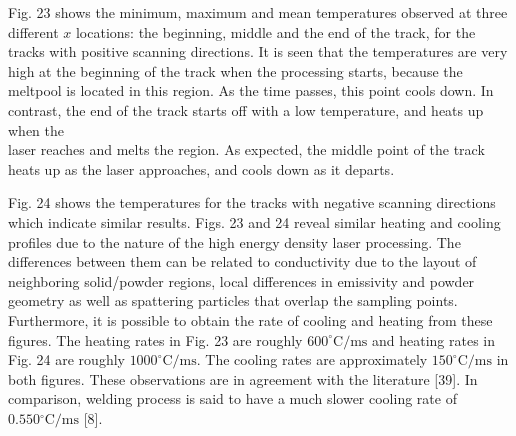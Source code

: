 \documentclass[10pt]{article}
\begin{document}
Fig. 23 shows the minimum, maximum and mean temperatures observed at three different $x$ locations: the beginning, middle and the end of the track, for the tracks with positive scanning directions. It is seen that the temperatures are very high at the beginning of the track when the processing starts, because the meltpool is located in this region. As the time passes, this point cools down. In contrast, the end of the track starts off with a low temperature, and heats up when the\\
laser reaches and melts the region. As expected, the middle point of the track heats up as the laser approaches, and cools down as it departs.

Fig. 24 shows the temperatures for the tracks with negative scanning directions which indicate similar results. Figs. 23 and 24 reveal similar heating and cooling profiles due to the nature of the high energy density laser processing. The differences between them can be related to conductivity due to the layout of neighboring solid/powder regions, local differences in emissivity and powder geometry as well as spattering particles that overlap the sampling points. Furthermore, it is possible to obtain the rate of cooling and heating from these figures. The heating rates in Fig. 23 are roughly $600^{\circ} \mathrm{C} / \mathrm{ms}$ and heating rates in Fig. 24 are roughly $1000^{\circ} \mathrm{C} / \mathrm{ms}$. The cooling rates are approximately $150^{\circ} \mathrm{C} / \mathrm{ms}$ in both figures. These observations are in agreement with the literature [39]. In comparison, welding process is said to have a much slower cooling rate of $0.550{ }^{\circ} \mathrm{C} / \mathrm{ms}$ [8].
\end{document}
